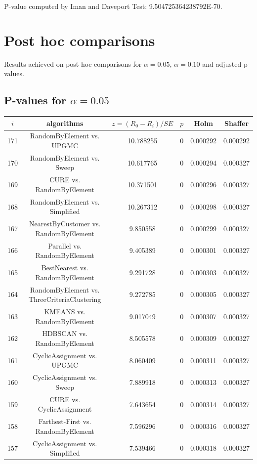 \documentclass[a4paper,10pt]{article}
\begin{document}
\begin{landscape}
P-value computed by Iman and Daveport Test: 9.504725364238792E-70.\newline



\pagebreak

\section{Post hoc comparisons}

Results achieved on post hoc comparisons for $\alpha = 0.05$, $\alpha = 0.10$ and adjusted p-values.

\subsection{P-values for $\alpha=0.05$}

\begin{table}[!htp]
\centering\scriptsize
\begin{tabular}{cccccc}
$i$&algorithms&$z=(R_0 - R_i)/SE$&$p$&Holm&Shaffer\\
\hline171&RandomByElement vs. UPGMC&10.788255&0&0.000292&0.000292\\
170&RandomByElement vs. Sweep&10.617765&0&0.000294&0.000327\\
169&CURE vs. RandomByElement&10.371501&0&0.000296&0.000327\\
168&RandomByElement vs. Simplified&10.267312&0&0.000298&0.000327\\
167&NearestByCustomer vs. RandomByElement&9.850558&0&0.000299&0.000327\\
166&Parallel vs. RandomByElement&9.405389&0&0.000301&0.000327\\
165&BestNearest vs. RandomByElement&9.291728&0&0.000303&0.000327\\
164&RandomByElement vs. ThreeCriteriaClustering&9.272785&0&0.000305&0.000327\\
163&KMEANS vs. RandomByElement&9.017049&0&0.000307&0.000327\\
162&HDBSCAN vs. RandomByElement&8.505578&0&0.000309&0.000327\\
161&CyclicAssignment vs. UPGMC&8.060409&0&0.000311&0.000327\\
160&CyclicAssignment vs. Sweep&7.889918&0&0.000313&0.000327\\
159&CURE vs. CyclicAssignment&7.643654&0&0.000314&0.000327\\
158&Farthest-First vs. RandomByElement&7.596296&0&0.000316&0.000327\\
157&CyclicAssignment vs. Simplified&7.539466&0&0.000318&0.000327\\

\end{tabular}
\end{table}
\end{landscape}
\end{document}
